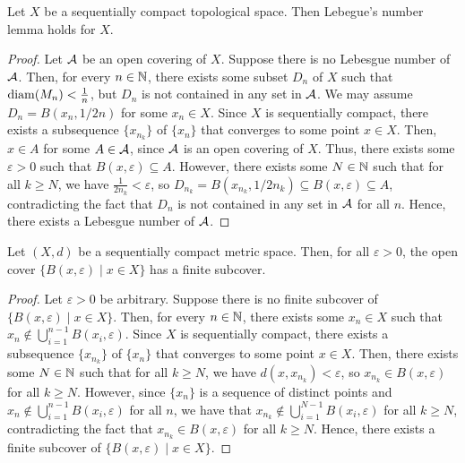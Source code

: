 \begin{lemma}
    Let $X$ be a sequentially compact topological space. Then Lebegue's number lemma holds for $X$.
\end{lemma}
\begin{proof}
    Let $\mathcal{A}$ be an open covering of $X$. Suppose there is no Lebesgue number of $\mathcal{A}$. Then, for every $n \in \mathbb{N}$, there exists some subset $D_{n}$ of $X$ such that $\operatorname{diam}(M_{n}) < \frac{1}{n}$, but $D_{n}$ is not contained in any set in $\mathcal{A}$. We may assume $D_{n} = B(x_{n},1/2n)$ for some $x_{n} \in X$. Since $X$ is sequentially compact, there exists a subsequence $\{x_{n_{k}}\}$ of $\{x_{n}\}$ that converges to some point $x \in X$. Then, $x \in A$ for some $A \in \mathcal{A}$, since $\mathcal{A}$ is an open covering of $X$. Thus, there exists some $\varepsilon > 0$ such that $B(x,\varepsilon) \subseteq A$. However, there exists some $N \in \mathbb{N}$ such that for all $k \geq N$, we have $\frac{1}{2n_{k}} < \varepsilon$, so $D_{n_{k}} = B(x_{n_{k}},1/2n_{k}) \subseteq B(x,\varepsilon) \subseteq A$, contradicting the fact that $D_{n}$ is not contained in any set in $\mathcal{A}$ for all $n$. Hence, there exists a Lebesgue number of $\mathcal{A}$.
\end{proof}

\begin{lemma}
    Let $(X,d)$ be a sequentially compact metric space. Then, for all $\varepsilon > 0$, the open cover $\{B(x,\varepsilon) \mid x \in X\}$ has a finite subcover.
\end{lemma}
\begin{proof}
    Let $\varepsilon > 0$ be arbitrary. Suppose there is no finite subcover of $\{B(x,\varepsilon) \mid x \in X\}$. Then, for every $n \in \mathbb{N}$, there exists some $x_{n} \in X$ such that $x_{n} \notin \bigcup_{i=1}^{n-1} B(x_{i},\varepsilon)$. Since $X$ is sequentially compact, there exists a subsequence $\{x_{n_{k}}\}$ of $\{x_{n}\}$ that converges to some point $x \in X$. Then, there exists some $N \in \mathbb{N}$ such that for all $k \geq N$, we have $d(x,x_{n_{k}}) < \varepsilon$, so $x_{n_{k}} \in B(x,\varepsilon)$ for all $k \geq N$. However, since $\{x_{n}\}$ is a sequence of distinct points and $x_{n} \notin \bigcup_{i=1}^{n-1} B(x_{i},\varepsilon)$ for all $n$, we have that $x_{n_{k}} \notin \bigcup_{i=1}^{N-1} B(x_{i},\varepsilon)$ for all $k \geq N$, contradicting the fact that $x_{n_{k}} \in B(x,\varepsilon)$ for all $k \geq N$. Hence, there exists a finite subcover of $\{B(x,\varepsilon) \mid x \in X\}$.
\end{proof}


